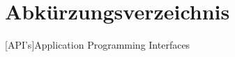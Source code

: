 

\section*{Abkürzungsverzeichnis}

\begin{acronym}[APIAPI] %

\setlength{\itemsep}{-\parsep} %

[API's]{Application Programming Interfaces}

\end{acronym}
